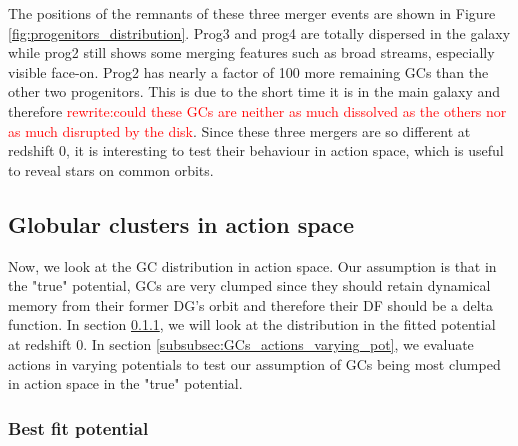 The positions of the remnants of these three merger events are shown in Figure \ref{fig:progenitors_distribution}. Prog3 and prog4 are totally dispersed in the galaxy while prog2 still shows some merging features such as broad streams, especially visible face-on. Prog2 has nearly a factor of 100 more remaining \acp{GC} than the other two progenitors. This is due to the short time it is in the main galaxy and therefore \textcolor{red}{rewrite:could these \acp{GC} are neither as much dissolved as the others nor as much disrupted by the disk}. Since these three mergers are so different at redshift 0, it is interesting to test their behaviour in action space, which is useful to reveal stars on common orbits. 

\subsection{Globular clusters in action space}\label{subsec:GCs_action_space}
Now, we look at the \ac{GC} distribution in action space. Our assumption is that in the "true" potential, \acp{GC} are very clumped since they should retain dynamical memory from their former \ac{DG}'s orbit and therefore their \ac{DF} should be a delta function. In section \ref{subsubsec:GCs_actions_right_pot}, we will look at the distribution in the fitted potential at redshift 0. In section \ref{subsubsec:GCs_actions_varying_pot}, we evaluate actions in varying potentials to test our assumption of \acp{GC} being most clumped in action space in the "true" potential. 

\subsubsection{Best fit potential}\label{subsubsec:GCs_actions_right_pot}

